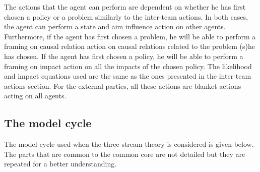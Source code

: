 The actions that the agent can perform are dependent on whether he has first chosen a policy or a problem similarly to the inter-team actions. In both cases, the agent can perform a state and aim influence action on other agents. Furthermore, if the agent has first chosen a problem, he will be able to perform a framing on causal relation action on causal relations related to the problem (s)he has chosen. If the agent has first chosen a policy, he will be able to perform a framing on impact action on all the impacts of the chosen policy. The likelihood and impact equations used are the same as the ones presented in the inter-team actions section. For the external parties, all these actions are blanket actions acting on all agents. 


\subsection{The model cycle}

The model cycle used when the three stream theory is considered is given below. The parts that are common to the common core are not detailed but they are repeated for a better understanding.

